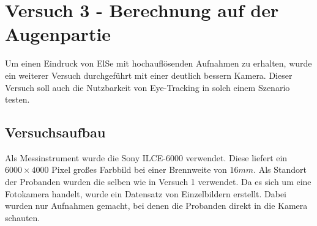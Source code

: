 \section{Versuch 3 - Berechnung auf der Augenpartie}
Um einen Eindruck von ElSe mit hochauflösenden Aufnahmen zu erhalten, wurde ein weiterer Versuch durchgeführt mit einer deutlich bessern Kamera. Dieser Versuch soll auch die Nutzbarkeit von Eye-Tracking in solch einem Szenario testen.
\subsection{Versuchsaufbau}
Als Messinstrument wurde die Sony ILCE-6000 verwendet. Diese liefert ein $6000\times 4000$ Pixel großes Farbbild bei einer Brennweite von  $16mm$. Als Standort der Probanden wurden die selben wie in Versuch 1  verwendet. Da es sich um eine Fotokamera handelt, wurde ein Datensatz von Einzelbildern erstellt. Dabei wurden nur Aufnahmen gemacht, bei denen die Probanden direkt in die Kamera schauten.
